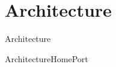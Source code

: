\section{Architecture}

\begin{frame}{Architecture}{}
\centering
\begin{figure}
  \scalebox{0.75}{}
\end{figure}
\end{frame}

\begin{frame}{Architecture}{HomePort}
\centering
\begin{figure}
\end{figure}
\end{frame}

